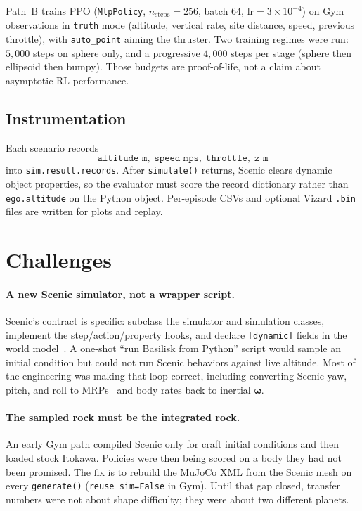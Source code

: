 \documentclass[10pt]{article}
\begin{document}
Path~B trains PPO (\texttt{MlpPolicy}, $n_{\mathrm{steps}}=256$, batch $64$, $\mathrm{lr}=3{\times}10^{-4}$) on Gym observations in \texttt{truth} mode (altitude, vertical rate, site distance, speed, previous throttle), with \texttt{auto\_point} aiming the thruster.
Two training regimes were run: $5{,}000$ steps on sphere only, and a progressive $4{,}000$ steps per stage (sphere then ellipsoid then bumpy).
Those budgets are proof-of-life, not a claim about asymptotic RL performance.

\subsection{Instrumentation}

Each scenario records
\[
\texttt{altitude\_m},\; \texttt{speed\_mps},\; \texttt{throttle},\; \texttt{z\_m}
\]
into \texttt{sim.result.records}.
After \texttt{simulate()} returns, Scenic clears dynamic object properties, so the evaluator must score the record dictionary rather than \texttt{ego.altitude} on the Python object.
Per-episode CSVs and optional Vizard \texttt{.bin} files are written for plots and replay.

\section{Challenges}
\label{sec:challenges}

\paragraph{A new Scenic simulator, not a wrapper script.}
Scenic's contract is specific: subclass the simulator and simulation classes, implement the step/action/property hooks, and declare \texttt{[dynamic]} fields in the world model~\citep{scenicdocs}.
A one-shot ``run Basilisk from Python'' script would sample an initial condition but could not run Scenic behaviors against live altitude.
Most of the engineering was making that loop correct, including converting Scenic yaw, pitch, and roll to MRPs~\citep{schaub1996mrp} and body rates back to inertial $\boldsymbol{\omega}$.

\paragraph{The sampled rock must be the integrated rock.}
An early Gym path compiled Scenic only for craft initial conditions and then loaded stock Itokawa.
Policies were then being scored on a body they had not been promised.
The fix is to rebuild the MuJoCo XML from the Scenic mesh on every \texttt{generate()} (\texttt{reuse\_sim=False} in Gym).
Until that gap closed, transfer numbers were not about shape difficulty; they were about two different planets.
\end{document}
